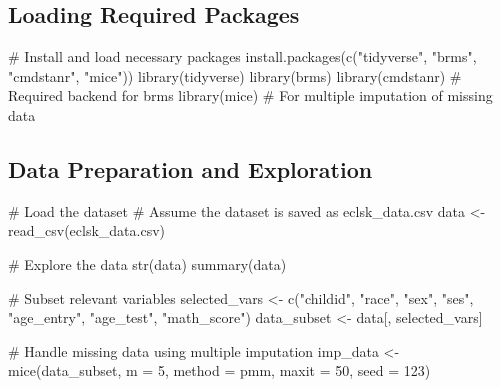 \documentclass[
  letterpaper,
  DIV=11,
  numbers=noendperiod]{scrreprt}
\newenvironment{Shaded}{\begin{snugshade}}{\end{snugshade}}
\newcommand{\AttributeTok}[1]{\textcolor[rgb]{0.40,0.45,0.13}{#1}}
\newcommand{\CommentTok}[1]{\textcolor[rgb]{0.37,0.37,0.37}{#1}}
\newcommand{\DecValTok}[1]{\textcolor[rgb]{0.68,0.00,0.00}{#1}}
\newcommand{\FunctionTok}[1]{\textcolor[rgb]{0.28,0.35,0.67}{#1}}
\newcommand{\NormalTok}[1]{\textcolor[rgb]{0.00,0.23,0.31}{#1}}
\newcommand{\OtherTok}[1]{\textcolor[rgb]{0.00,0.23,0.31}{#1}}
\newcommand{\StringTok}[1]{\textcolor[rgb]{0.13,0.47,0.30}{#1}}
\begin{document}
\subsection{Loading Required Packages}\label{loading-required-packages}

\begin{Shaded}
\begin{Highlighting}[]
\CommentTok{\# Install and load necessary packages}
\FunctionTok{install.packages}\NormalTok{(}\FunctionTok{c}\NormalTok{(}\StringTok{"tidyverse"}\NormalTok{, }\StringTok{"brms"}\NormalTok{, }\StringTok{"cmdstanr"}\NormalTok{, }\StringTok{"mice"}\NormalTok{))}
\FunctionTok{library}\NormalTok{(tidyverse)}
\FunctionTok{library}\NormalTok{(brms)}
\FunctionTok{library}\NormalTok{(cmdstanr)  }\CommentTok{\# Required backend for brms}
\FunctionTok{library}\NormalTok{(mice)  }\CommentTok{\# For multiple imputation of missing data}
\end{Highlighting}
\end{Shaded}

\subsection{Data Preparation and
Exploration}\label{data-preparation-and-exploration}

\begin{Shaded}
\begin{Highlighting}[]
\CommentTok{\# Load the dataset}
\CommentTok{\# Assume the dataset is saved as \textquotesingle{}eclsk\_data.csv\textquotesingle{}}
\NormalTok{data }\OtherTok{\textless{}{-}} \FunctionTok{read\_csv}\NormalTok{(}\StringTok{\textquotesingle{}eclsk\_data.csv\textquotesingle{}}\NormalTok{)}

\CommentTok{\# Explore the data}
\FunctionTok{str}\NormalTok{(data)}
\FunctionTok{summary}\NormalTok{(data)}

\CommentTok{\# Subset relevant variables}
\NormalTok{selected\_vars }\OtherTok{\textless{}{-}} \FunctionTok{c}\NormalTok{(}\StringTok{"childid"}\NormalTok{, }\StringTok{"race"}\NormalTok{, }\StringTok{"sex"}\NormalTok{, }\StringTok{"ses"}\NormalTok{, }\StringTok{"age\_entry"}\NormalTok{, }\StringTok{"age\_test"}\NormalTok{, }\StringTok{"math\_score"}\NormalTok{)}
\NormalTok{data\_subset }\OtherTok{\textless{}{-}}\NormalTok{ data[, selected\_vars]}

\CommentTok{\# Handle missing data using multiple imputation}
\NormalTok{imp\_data }\OtherTok{\textless{}{-}} \FunctionTok{mice}\NormalTok{(data\_subset, }\AttributeTok{m =} \DecValTok{5}\NormalTok{, }\AttributeTok{method =} \StringTok{\textquotesingle{}pmm\textquotesingle{}}\NormalTok{, }\AttributeTok{maxit =} \DecValTok{50}\NormalTok{, }\AttributeTok{seed =} \DecValTok{123}\NormalTok{)}
\end{Highlighting}
\end{Shaded}
\end{document}
